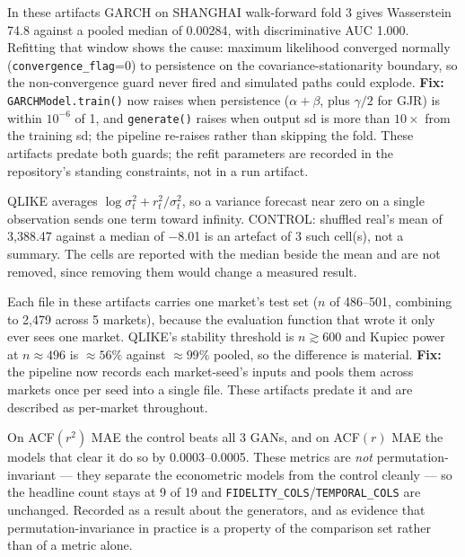 \documentclass[10pt]{article}
\newcommand{\auditrow}[5]{%
  \begin{tcolorbox}[mybox={#2}{#3},
    title={\textbf{[#1]}\quad #4},
    before skip=4pt, after skip=4pt, breakable]
  \small #5
  \end{tcolorbox}}
\begin{document}
\auditrow{FIXED IN PIPELINE}{Amber}{ABg}%
  {GARCH fits converged to non-stationary parameters and generated explosive paths}%
  {In these artifacts GARCH on SHANGHAI walk-forward fold 3 gives Wasserstein 74.8 against a pooled median of 0.00284, with discriminative AUC 1.000. Refitting that window shows the cause: maximum likelihood converged normally (\texttt{convergence\_flag}=0) to persistence on the covariance-stationarity boundary, so the non-convergence guard never fired and simulated paths could explode. \textbf{Fix:} \texttt{GARCHModel.train()} now raises when persistence ($\alpha+\beta$, plus $\gamma/2$ for GJR) is within $10^{-6}$ of 1, and \texttt{generate()} raises when output sd is more than $10\times$ from the training sd; the pipeline re-raises rather than skipping the fold. These artifacts predate both guards; the refit parameters are recorded in the repository's standing constraints, not in a run artifact.}

\auditrow{REPORTED}{Indigo}{IBg}%
  {Downstream QLIKE degenerate in 4 of 90 cells}%
  {QLIKE averages $\log\sigma_t^2 + r_t^2/\sigma_t^2$, so a variance forecast near zero on a single observation sends one term toward infinity. CONTROL: shuffled real's mean of 3,388.47 against a median of $-$8.01 is an artefact of 3 such cell(s), not a summary. The cells are reported with the median beside the mean and are not removed, since removing them would change a measured result.}

\auditrow{FIXED IN PIPELINE}{Amber}{ABg}%
  {\texttt{pooled\_downstream\_utility.csv} was not pooled}%
  {Each file in these artifacts carries one market's test set ($n$ of 486--501, combining to 2,479 across 5 markets), because the evaluation function that wrote it only ever sees one market. QLIKE's stability threshold is $n\gtrsim600$ and Kupiec power at $n\approx496$ is $\approx56\%$ against $\approx99\%$ pooled, so the difference is material. \textbf{Fix:} the pipeline now records each market-seed's inputs and pools them across markets once per seed into a single file. These artifacts predate it and are described as per-market throughout.}

\auditrow{OPEN}{Indigo}{IBg}%
  {Shuffled control outperforms genuine GANs on ordering-sensitive metrics}%
  {On ACF$(r^2)$ MAE the control beats all 3 GANs, and on ACF$(r)$ MAE the models that clear it do so by 0.0003--0.0005. These metrics are \emph{not} permutation-invariant --- they separate the econometric models from the control cleanly --- so the headline count stays at 9 of 19 and \texttt{FIDELITY\_COLS}/\texttt{TEMPORAL\_COLS} are unchanged. Recorded as a result about the generators, and as evidence that permutation-invariance in practice is a property of the comparison set rather than of a metric alone.}
\end{document}
